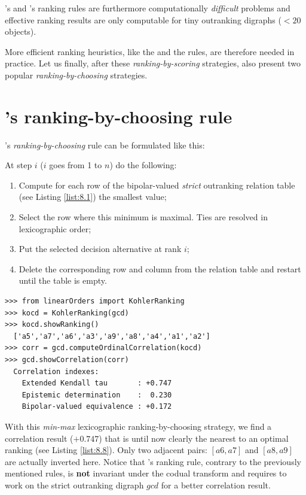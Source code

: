 \Kemeny 's and \Slater 's ranking rules are furthermore computationally \emph{difficult} problems and effective ranking results are only computable for tiny outranking digraphs ($< 20$ objects). 

More efficient ranking heuristics, like the \Copeland and the \NetFlows rules, are therefore needed in practice. Let us finally, after these \emph{ranking-by-scoring} strategies, also present two popular \emph{ranking-by-choosing} strategies.

\section{\Kohler 's ranking-by-choosing rule}
\label{sec:8.6}

\Kohler 's \emph{ranking-by-choosing} rule can be formulated like this:

\noindent At step $i$ ($i$ goes from 1 to $n$) do the following:
\begin{enumerate}
\item Compute for each row of the bipolar-valued \emph{strict} outranking relation table (see Listing \ref{list:8.1}) the smallest value;
\item Select the row where this minimum is maximal. Ties are resolved in lexicographic order;
\item Put the selected decision alternative at rank $i$;
\item Delete the corresponding row and column from the relation table and restart until the table is empty.
\end{enumerate}
\begin{lstlisting}[caption={Computing a \Kohler ranking},label=list:8.13]   
>>> from linearOrders import KohlerRanking
>>> kocd = KohlerRanking(gcd)
>>> kocd.showRanking()
  ['a5','a7','a6','a3','a9','a8','a4','a1','a2']
>>> corr = gcd.computeOrdinalCorrelation(kocd)
>>> gcd.showCorrelation(corr)
  Correlation indexes:
    Extended Kendall tau       : +0.747
    Epistemic determination    :  0.230
    Bipolar-valued equivalence : +0.172
\end{lstlisting}

With this \emph{min-max} lexicographic ranking-by-choosing strategy, we find a correlation result ($+0.747$) that is until now clearly the nearest to an optimal \Kemeny ranking (see Listing \ref{list:8.8}). Only two adjacent pairs: $[a6, a7]$ and $[a8, a9]$ are actually inverted here. Notice that \Kohler 's ranking rule, contrary to the previously mentioned rules, is \textbf{not} invariant under the codual transform and requires to work on the strict outranking digraph $gcd$ for a better correlation result.

